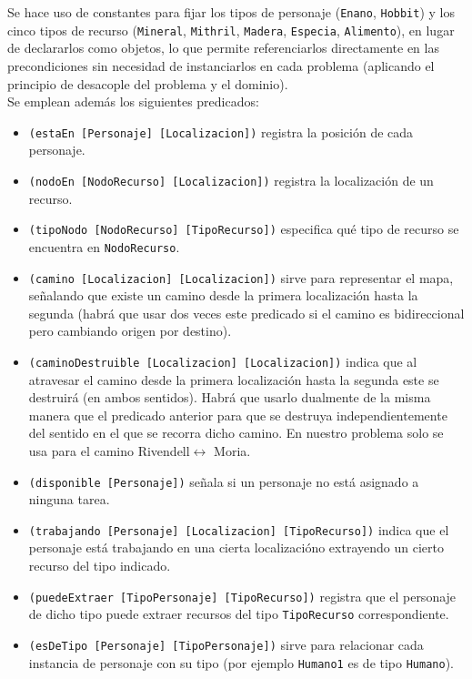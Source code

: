 \documentclass[10pt]{article}
\begin{document}
Se hace uso de constantes para fijar los tipos de personaje (\texttt{Enano}, \texttt{Hobbit}) y los cinco tipos de recurso (\texttt{Mineral}, \texttt{Mithril}, \texttt{Madera}, \texttt{Especia}, \texttt{Alimento}), en lugar de declararlos como objetos, lo que permite referenciarlos directamente en las precondiciones sin necesidad de instanciarlos en cada problema (aplicando el principio de desacople del problema y el dominio).\\

Se emplean además los siguientes predicados:
\begin{itemize}[label=-]
    \item \texttt{(estaEn [Personaje] [Localizacion])} registra la posición de cada personaje.
    \item \texttt{(nodoEn [NodoRecurso] [Localizacion])} registra la localización de un recurso.
    \item \texttt{(tipoNodo [NodoRecurso] [TipoRecurso])} especifica qué tipo de recurso se encuentra en \texttt{NodoRecurso}.
    \item \texttt{(camino [Localizacion] [Localizacion])} sirve para representar el mapa, señalando que existe un camino desde la primera localización hasta la segunda (habrá que usar dos veces este predicado si el camino es bidireccional pero cambiando origen por destino).
    \item \texttt{(caminoDestruible [Localizacion] [Localizacion])} indica que al atravesar el camino desde la primera localización hasta la segunda este se destruirá (en ambos sentidos). Habrá que usarlo dualmente de la misma manera que el predicado anterior para que se destruya independientemente del sentido en el que se recorra dicho camino. En nuestro problema solo se usa para el camino Rivendell$ \leftrightarrow$ Moria.
    \item \texttt{(disponible [Personaje])} señala si un personaje no está asignado a ninguna tarea.
    \item \texttt{(trabajando [Personaje] [Localizacion] [TipoRecurso])} indica que el personaje está trabajando en una cierta localizacióno extrayendo un cierto recurso del tipo indicado.
    \item \texttt{(puedeExtraer [TipoPersonaje] [TipoRecurso])} registra que el personaje de dicho tipo puede extraer recursos del tipo \texttt{TipoRecurso} correspondiente.
    \item \texttt{(esDeTipo [Personaje] [TipoPersonaje])} sirve para relacionar cada instancia de personaje con su tipo (por ejemplo \texttt{Humano1} es de tipo \texttt{Humano}).
\end{itemize}
\end{document}
